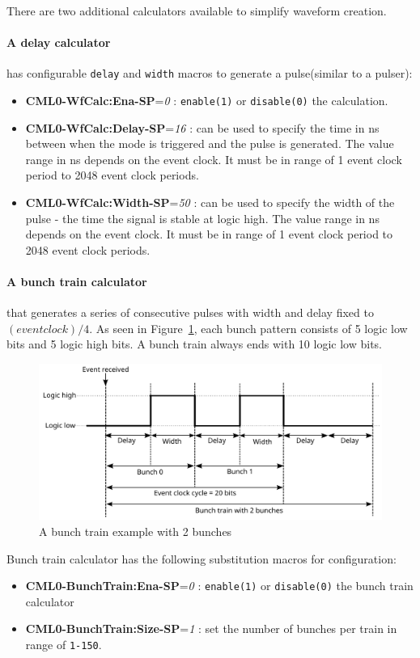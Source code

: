 \documentclass[12pt,a4paper]{article}
\begin{document}
\begin{itemize}
	There are two additional calculators available to simplify waveform creation. 
	\paragraph{A delay calculator} has configurable \texttt{delay} and \texttt{width} macros to generate a pulse(similar to a pulser):
	\begin{itemize}
	\item
	  \textbf{CML0-WfCalc:Ena-SP}=\emph{0} : \texttt{enable(1)} or \texttt{disable(0)} the calculation.
	\item
	  \textbf{CML0-WfCalc:Delay-SP}=\emph{16} : can be used to specify the time in ns between when the mode is triggered and the pulse is generated. The value range in ns depends on the event clock. It must be in range of 1 event clock period to 2048 event clock periods.
	\item
	  \textbf{CML0-WfCalc:Width-SP}=\emph{50} : can be used to specify the width of the pulse - the time the signal is stable at logic high. The value range in ns depends on the event clock. It must be in range of 1 event clock period to 2048 event clock periods.
	\end{itemize}
	
	\paragraph{A bunch train calculator} that generates a series of consecutive pulses with width and delay fixed to $(event clock) / 4$. As seen in Figure~\ref{fig:output_cml_bunch}, each bunch pattern consists of 5 logic low bits and 5 logic high bits. A bunch train always ends with 10 logic low bits.
	\begin{figure}[H]
		\centering
		\includegraphics[width=0.96\columnwidth]{./img/bunchTrain}
		\caption{A bunch train example with 2 bunches}
		\label{fig:output_cml_bunch}
	\end{figure}
	
	Bunch train calculator has the following substitution macros for configuration:
	\begin{itemize}
	\item
	  \textbf{CML0-BunchTrain:Ena-SP}=\emph{0} : \texttt{enable(1)} or \texttt{disable(0)} the bunch train calculator
	\item
	  \textbf{CML0-BunchTrain:Size-SP}=\emph{1} : set the number of bunches per train in range of \texttt{1-150}.
	\end{itemize}
	
\end{itemize}
\end{document}
